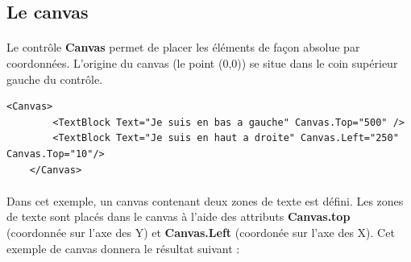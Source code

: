 \documentclass[twoside,UTF8]{EPURapport}
\begin{document}
		\subsection{Le canvas}

\paragraph{}
Le contrôle \textbf{Canvas} permet de placer les éléments de façon absolue par coordonnées. L'origine du canvas (le point (0,0)) se situe dans le coin supérieur gauche du contrôle. 

\begin{lstlisting}[caption={Exemple d'utilisation du contrôle \textbf{Canvas}}]
    <Canvas>
        <TextBlock Text="Je suis en bas a gauche" Canvas.Top="500" />
        <TextBlock Text="Je suis en haut a droite" Canvas.Left="250" Canvas.Top="10"/>
    </Canvas>
\end{lstlisting}

\paragraph{}
Dans cet exemple, un canvas contenant deux zones de texte est défini. Les zones de texte sont placés dans le canvas à l'aide des attributs \textbf{Canvas.top} (coordonnée sur l'axe des Y) et \textbf{Canvas.Left} (coordonée sur l'axe des X). Cet exemple de canvas donnera le résultat suivant : 
\end{document}
